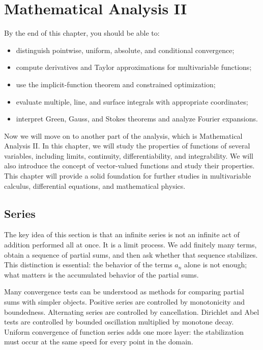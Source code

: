 \chapter{Mathematical Analysis II}

\begin{learningobjectives}
By the end of this chapter, you should be able to:
\begin{itemize}
    \item distinguish pointwise, uniform, absolute, and conditional convergence;
    \item compute derivatives and Taylor approximations for multivariable functions;
    \item use the implicit-function theorem and constrained optimization;
    \item evaluate multiple, line, and surface integrals with appropriate coordinates;
    \item interpret Green, Gauss, and Stokes theorems and analyze Fourier expansions.
\end{itemize}
\end{learningobjectives}

Now we will move on to another part of the analysis, which is Mathematical Analysis II. In this chapter, we will study the properties of functions of several variables, including limits, continuity, differentiability, and integrability. We will also introduce the concept of vector-valued functions and study their properties. This chapter will provide a solid foundation for further studies in multivariable calculus, differential equations, and mathematical physics.

\section{Series}


The key idea of this section is that an infinite series is not an infinite act of addition performed all at once. It is a limit process. We add finitely many terms, obtain a sequence of partial sums, and then ask whether that sequence stabilizes. This distinction is essential: the behavior of the terms $a_n$ alone is not enough; what matters is the accumulated behavior of the partial sums.

Many convergence tests can be understood as methods for comparing partial sums with simpler objects. Positive series are controlled by monotonicity and boundedness. Alternating series are controlled by cancellation. Dirichlet and Abel tests are controlled by bounded oscillation multiplied by monotone decay. Uniform convergence of function series adds one more layer: the stabilization must occur at the same speed for every point in the domain.

